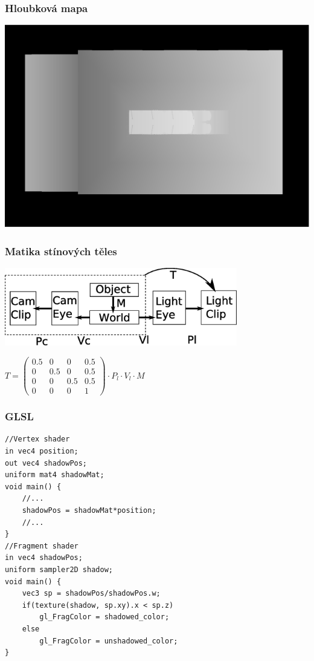\begin{frame}
    \frametitle{Hloubková mapa}
    \includegraphics[width=\textwidth]{pics/shadows/shadowMapping/depth.eps}
\end{frame}


\begin{frame}
    \frametitle{Matika stínových těles}

    \includegraphics[width=4in]{pics/shadows/shadowMapping/smspc.eps}
    
    \vfill

    $\displaystyle T = \left( \begin{array}{cccc}
        0.5 & 0   & 0   & 0.5 \\
        0   & 0.5 & 0   & 0.5 \\
        0   & 0   & 0.5 & 0.5 \\
        0   & 0   & 0   & 1 \end{array} \right) \cdot P_l \cdot V_l \cdot M$
\end{frame}

\begin{frame}[fragile]
    \frametitle{GLSL}

{\small
  \begin{verbatim}
//Vertex shader
in vec4 position;
out vec4 shadowPos;
uniform mat4 shadowMat;
void main() {
    //...
    shadowPos = shadowMat*position;
    //...
}
//Fragment shader
in vec4 shadowPos;
uniform sampler2D shadow;
void main() {
    vec3 sp = shadowPos/shadowPos.w;
    if(texture(shadow, sp.xy).x < sp.z)
        gl_FragColor = shadowed_color;
    else
        gl_FragColor = unshadowed_color;
}
  \end{verbatim}
}
\end{frame}

